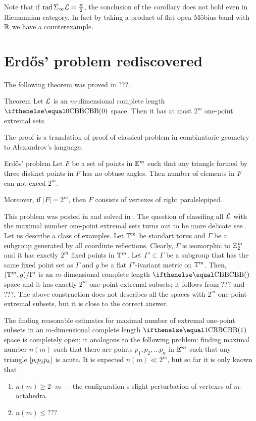 Note that if $\mathop{\rm rad}\nolimits\Sigma_\infty \mathcal{L}=\tfrac{\uppi}2$, the conclusion of the corollary does not hold even in Riemannian category.
In fact by taking a product of flat open M\"obius band with $\mathbb{R}$ we have a counterexample.



\section{Erd\H{o}s' problem rediscovered}

The following theorem was proved in ???.

\begin{thm}{Theorem}\label{thm:extr-point}
Let $\mathcal{L}$ is an $m$-dimensional complete length $\Alex0$ space.
Then it has at most $2^m$ one-point extremal sets.
\end{thm}


The proof is a translation of proof of classical problem in combinatoric geometry to Alexandrov's language.

\begin{thm}{Erd\H{o}s' problem}
Let $F$ be a set of points in $\mathbb{E}^m$ such that any triangle formed by three distinct points in $F$ has no obtuse angles.
Then number of elements in $F$ can not exeed $2^m$.

Moreover, if $|F|=2^m$, then $F$ consists of vertexes of right paralelepiped.
\end{thm}

This problem was posted in \cite{erdos} and solved in \cite{danzer-gruenbaum}.
The question of classifing all $\mathcal{L}$ with the maximal number one-point extremal sets turns out to be more delicate see \cite{lebedeva}.
Let us describe a class of examples.
Let $\mathbb{T}^m$ be standart torus 
and $\Gamma$ be a subgroup generated by all coordinte reflections.
Clearly, $\Gamma$ is isomorphic to $\mathbb{Z}_2^m$ and it has exactly $2^m$ fixed points in $\mathbb{T}^m$.
Let $\Gamma'\subset\Gamma$ be a subgroup that has the same fixed point set as $\Gamma$ 
and $g$ be a flat $\Gamma'$-ivariant metric on $\mathbb{T}^m$.
Then, $(\mathbb{T}^m,g)/\Gamma'$ is an $m$-dimensional complete length $\Alex{}$ space and it has exactly $2^m$ one-point extremal subsets; it follows from ??? and ???.
The above construction does not describes all the spaces with $2^m$ one-point extremal subsets, but it is close to the correct answer.

The finding reasonable estimates for maximal number of extremal one-point subsets in an $m$-dimensional complete length $\Alex{1}$ space is completely open;
it analogous to the following problem: finding maximal number $n(m)$ such that there are points $p_1,p_2,\dots p_n$ in $\mathbb{E}^m$ such that any triangle $[{p_i}{p_j}{p_k}]$ is acute.
It is expected $n(m)\ll 2^m$, but so far it is only known that 
\begin{enumerate}
\item $n(m)\ge 2\cdot m$ --- the configuration s slight perturbation of vertexes of $m$-octahedra.
\item $n(m)\le ???$
\end{enumerate}


